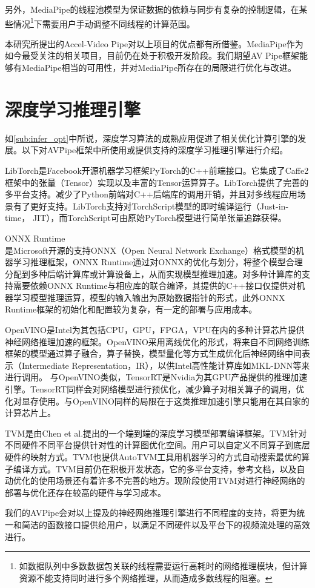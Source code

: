 另外，MediaPipe的线程池模型为保证数据的依赖与同步有复杂的控制逻辑，在某些情况\footnote{如数据队列中多数数据包关联的线程需要运行高耗时的网络推理模块，但计算资源不能支持同时进行多个网络推理，从而造成多数线程的阻塞。}下需要用户手动调整不同线程的计算范围。\par
本研究所提出的Accel-Video Pipe对以上项目的优点都有所借鉴。MediaPipe作为如今最受关注的相关项目，目前仍在处于积极开发阶段。我们期望AV Pipe框架能够有MediaPipe相当的可用性，并对MediaPipe所存在的局限进行优化与改进。\par
\section{深度学习推理引擎}\label{related:dl_engine}
如\ref{sub:infer_opt}中所说，深度学习算法的成熟应用促进了相关优化计算引擎的发展。以下对AV\~  Pipe框架中所使用或提供支持的深度学习推理引擎进行介绍。\par
LibTorch是Facebook开源机器学习框架PyTorch\cite{paszke2019pytorch}的C++前端接口。它集成了Caffe2\cite{markham2017caffe2}框架中的张量（Tensor）实现以及丰富的Tensor运算算子。LibTorch提供了完善的多平台支持。减少了Python前端对C++后端库的调用开销，并且对多线程应用场景有了更好支持。LibTorch支持对TorchScript模型的即时编译运行（Just-in-time， JIT），而TorchScript可由原始PyTorch模型进行简单张量追踪获得。\par
ONNX Runtime\cite{onnxruntime}是Microsoft开源的支持ONNX（Open Neural Network Exchange）\cite{onnx}格式模型的机器学习推理框架，ONNX Runtime通过对ONNX的优化与划分，将整个模型合理分配到多种后端计算库或计算设备上，从而实现模型推理加速。对多种计算库的支持需要依赖ONNX Runtime与相应库的联合编译，其提供的C++接口仅提供对机器学习模型推理运算，模型的输入输出为原始数据指针的形式，此外ONNX Runtime框架的初始化和配置较为复杂，有一定的部署与应用成本。\par
OpenVINO\cite{openvino}是Intel为其包括CPU，GPU，FPGA，VPU在内的多种计算芯片提供神经网络推理加速的框架。OpenVINO采用离线优化的形式，将来自不同网络训练框架的模型通过算子融合，算子替换，模型量化等方式生成优化后神经网络中间表示（Intermediate Representation，IR）\cite{cyphers2018intel}，以供Intel高性能计算库如MKL-DNN\cite{mkldnn}等来进行调用。
与OpenVINO类似，TensorRT\cite{tensorrt}是Nvidia为其GPU产品提供的推理加速引擎。TensorRT同样会对网络模型进行预优化，减少算子对相关算子的调用，优化对显存使用。与OpenVINO同样的局限在于这类推理加速引擎只能用在其自家的计算芯片上。\par
TVM\cite{chen2018tvm}是由Chen et al.提出的一个端到端的深度学习模型部署编译框架。TVM针对不同硬件不同平台提供针对性的计算图优化空间。用户可以自定义不同算子到底层硬件的映射方式。TVM也提供AutoTVM工具用机器学习的方式自动搜索最优的算子编译方式。TVM目前仍在积极开发状态，它的多平台支持，参考文档，以及自动优化的使用场景还有着许多不完善的地方。现阶段使用TVM对进行神经网络的部署与优化还存在较高的硬件与学习成本。\par
我们的AVPipe会对以上提及的神经网络推理引擎进行不同程度的支持，将更为统一和简洁的函数接口提供给用户，以满足不同硬件以及平台下的视频流处理的高效进行。
